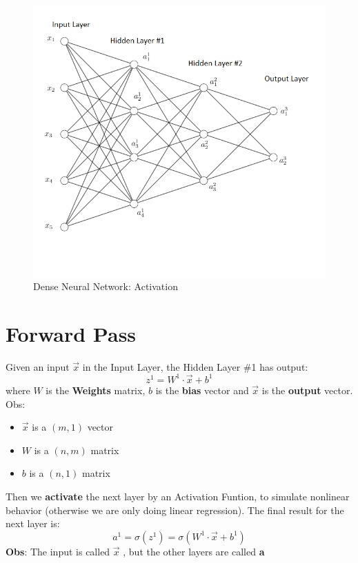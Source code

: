 \documentclass[12pt]{article}
\begin{document}
\begin{figure}[H]
    \centering
    \includegraphics[width=0.79\linewidth]{images/NN_info.png}
    \caption{Dense Neural Network: Activation}
    \label{fig2}
\end{figure}   


\section{Forward Pass}

Given an input $\overrightarrow{x}$ in the Input Layer, the Hidden Layer \#1 has output:
\begin{equation}
    z^{1} = W^{1} \cdot \overrightarrow{x} + b^{1}
\end{equation}
where $W$ is the \textbf{Weights} matrix, $b$ is the \textbf{bias} vector and $\overrightarrow{x}$ is the \textbf{output} vector.
\\
Obs:
\begin{itemize}
    \item $\overrightarrow{x}$ is a $(m,1)$ vector
    \item $W$ is a $(n,m)$ matrix
    \item $b$ is a $(n,1)$ matrix
\end{itemize}

Then we \textbf{activate} the next layer by an Activation Funtion, to simulate nonlinear behavior (otherwise we are only doing linear regression). The final result for the next layer is:
\begin{equation}
    a^{1} = \sigma (z^{1}) = \sigma ( W^{1} \cdot \overrightarrow{x} + b^{1} )
\end{equation}
\textbf{Obs}: The input is called $\overrightarrow{x}$ , but the other layers are called \textbf{a}
\end{document}
